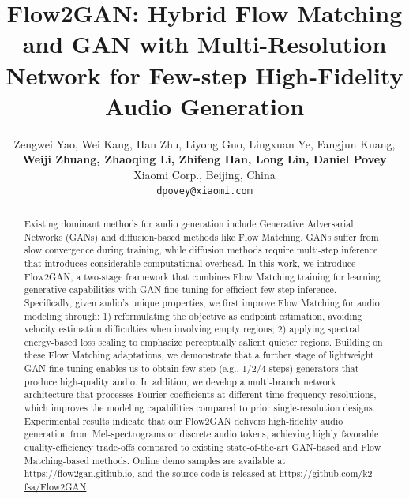 \documentclass{article} %
\title{Flow2GAN: Hybrid Flow Matching and GAN with Multi-Resolution Network for Few-step High-Fidelity Audio Generation}
\author{Zengwei Yao, Wei Kang, Han Zhu, Liyong Guo, Lingxuan Ye, Fangjun Kuang, \\
\textbf{Weiji Zhuang, Zhaoqing Li, Zhifeng Han, Long Lin, Daniel Povey}\\
Xiaomi Corp., Beijing, China \\
\texttt{dpovey@xiaomi.com} \\
}
\begin{document}
\maketitle

\begin{abstract}

Existing dominant methods for audio generation include Generative Adversarial Networks (GANs) and diffusion-based methods like Flow Matching. GANs suffer from slow convergence
during training, while diffusion methods require multi-step inference that introduces considerable computational overhead. In this work, we introduce Flow2GAN, a two-stage framework that combines Flow Matching training for learning generative capabilities with GAN fine-tuning for efficient few-step inference. Specifically, given audio's unique properties, we first improve Flow Matching for audio modeling through: 1) reformulating the objective as endpoint estimation, avoiding velocity estimation difficulties when involving empty regions; 2) applying spectral energy-based loss scaling to emphasize perceptually salient quieter regions. 
Building on these Flow Matching adaptations, we demonstrate that a further stage of lightweight GAN fine-tuning enables us to obtain few-step (e.g., 1/2/4 steps) generators that produce high-quality audio. In addition, we develop a multi-branch network architecture that processes Fourier coefficients at different time-frequency resolutions, which improves the modeling capabilities compared to prior single-resolution designs. 
Experimental results indicate that our Flow2GAN delivers high-fidelity audio generation from Mel-spectrograms or discrete audio tokens, achieving highly favorable quality-efficiency trade-offs compared to existing state-of-the-art GAN-based and Flow Matching-based methods.
Online demo samples are available at \url{https://flow2gan.github.io},
and the source code is released at \url{https://github.com/k2-fsa/Flow2GAN}. 


\end{abstract}
\end{document}
